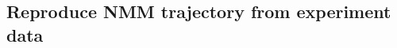 \documentclass[]{article}
\begin{document}
	\subsection{Reproduce NMM trajectory from experiment data}
%






	
\end{document}
